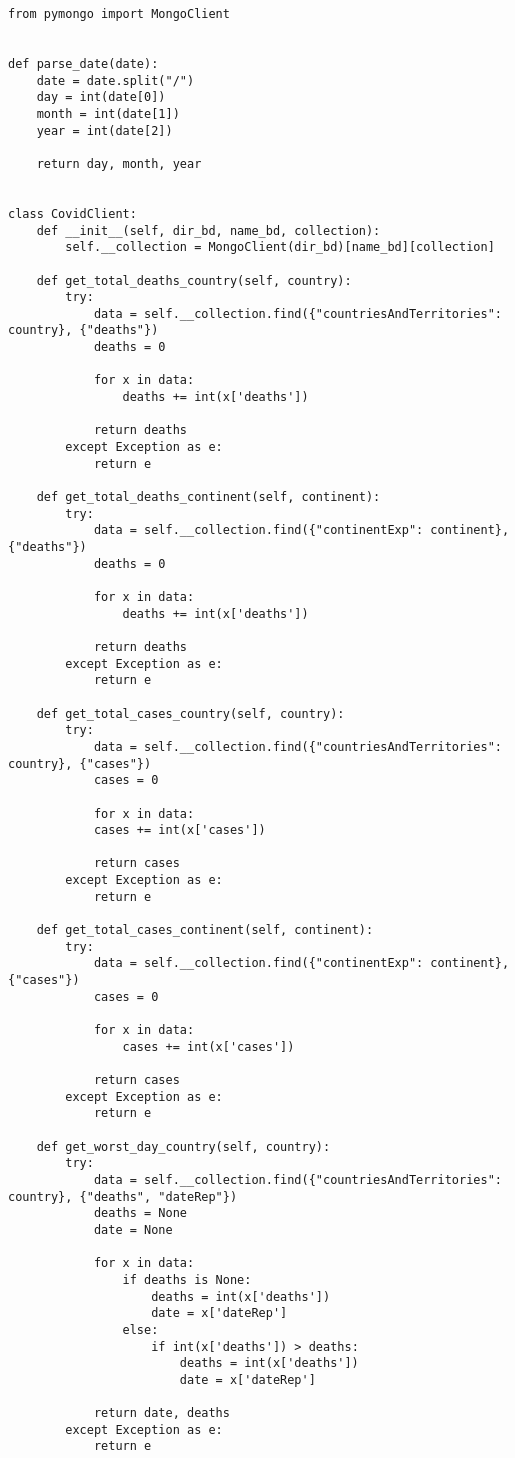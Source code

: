 \documentclass[11pt]{diazessay} %
\begin{document}
\lstset{language=Python}
\begin{lstlisting}
from pymongo import MongoClient


def parse_date(date):
	date = date.split("/")
	day = int(date[0])
	month = int(date[1])
	year = int(date[2])
	
	return day, month, year


class CovidClient:
	def __init__(self, dir_bd, name_bd, collection):
		self.__collection = MongoClient(dir_bd)[name_bd][collection]
	
	def get_total_deaths_country(self, country):
		try:
			data = self.__collection.find({"countriesAndTerritories": country}, {"deaths"})
			deaths = 0
			
			for x in data:
				deaths += int(x['deaths'])
			
			return deaths
		except Exception as e:
			return e
	
	def get_total_deaths_continent(self, continent):
		try:
			data = self.__collection.find({"continentExp": continent}, {"deaths"})
			deaths = 0
			
			for x in data:
				deaths += int(x['deaths'])
			
			return deaths
		except Exception as e:
			return e
	
	def get_total_cases_country(self, country):
		try:
			data = self.__collection.find({"countriesAndTerritories": country}, {"cases"})
			cases = 0
			
			for x in data:
			cases += int(x['cases'])
			
			return cases
		except Exception as e:
			return e
	
	def get_total_cases_continent(self, continent):
		try:
			data = self.__collection.find({"continentExp": continent}, {"cases"})
			cases = 0
			
			for x in data:
				cases += int(x['cases'])
		
			return cases
		except Exception as e:
			return e
	
	def get_worst_day_country(self, country):
		try:
			data = self.__collection.find({"countriesAndTerritories": country}, {"deaths", "dateRep"})
			deaths = None
			date = None
			
			for x in data:
				if deaths is None:
					deaths = int(x['deaths'])
					date = x['dateRep']
				else:
					if int(x['deaths']) > deaths:
						deaths = int(x['deaths'])
						date = x['dateRep']
			
			return date, deaths
		except Exception as e:
			return e
	

\end{lstlisting}
\end{document}
